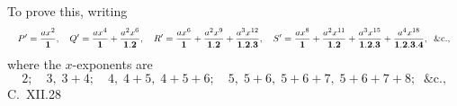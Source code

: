 \documentclass[11pt]{article}
\begin{document}
To prove this, writing
\[
\resizebox{\textwidth}{!}{$\displaystyle
P' = \frac{ax^{2}}{\mathbf{1}},\quad
Q' = \frac{ax^{4}}{\mathbf{1}}+\frac{a^{2}x^{6}}{\mathbf{1.2}},\quad
R' = \frac{ax^{6}}{\mathbf{1}}+\frac{a^{2}x^{9}}{\mathbf{1.2}}+\frac{a^{3}x^{12}}{\mathbf{1.2.3}},\quad
S' = \frac{ax^{8}}{\mathbf{1}}+\frac{a^{2}x^{11}}{\mathbf{1.2}}+\frac{a^{3}x^{15}}{\mathbf{1.2.3}}+\frac{a^{4}x^{18}}{\mathbf{1.2.3.4}},\;\;\&\text{c.,}
$}
\]
where the $x$-exponents are
\[
2;\quad 3,\;3+4;\quad 4,\;4+5,\;4+5+6;\quad 5,\;5+6,\;5+6+7,\;5+6+7+8;\;\;\&\text{c.,}
\]
\smallskip
\hfill C.~XII.\hfill 28
\end{document}
